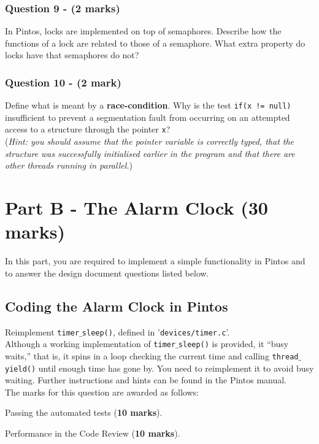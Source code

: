 \documentclass[a4paper,12pt]{article}
\begin{document}
\subsubsection*{Question 9 - (2 marks)}
In Pintos, locks are implemented on top of semaphores.
Describe how the functions of a lock are related to those of a semaphore.
What extra property do locks have that semaphores do not?

\subsubsection*{Question 10 - (2 mark)}
Define what is meant by a {\bf race-condition}. Why is the test \texttt{if(x != null)} 
insufficient to prevent a segmentation fault from occurring on an attempted access to a structure through the pointer \texttt{x}?\\
(\textit{Hint: you should assume that the pointer variable is correctly typed, that the structure was successfully initialised earlier in the program 
and that there are other threads running in parallel.})

\newpage
\section*{Part B - The Alarm Clock (30 marks)}

In this part, you are required to implement a simple functionality in Pintos and to answer the design document questions listed below.

\subsection*{Coding the Alarm Clock in Pintos} 
Reimplement \texttt{timer$\_$sleep()}, defined in '\texttt{devices/timer.c}’.\\ 

\noindent Although a working implementation of \texttt{timer$\_$sleep()} is provided, it “busy waits,” that is, 
it spins in a loop checking the current time and calling \texttt{thread$\_$yield()} until enough time has gone by. 
You need to reimplement it to avoid busy waiting. 
Further instructions and hints can be found in the Pintos manual.\\

\noindent The marks for this question are awarded as follows:

Passing the automated tests ({\bf 10 marks}). 

Performance in the Code Review ({\bf 10 marks}). 
\end{document}
